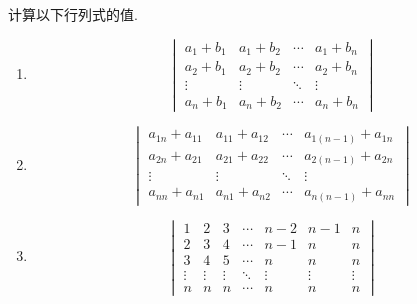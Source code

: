 \documentclass{ctexart}
\begin{document}
\begin{problem}
    计算以下行列式的值.
    \begin{enumerate}[label=\tbf{\arabic*}.,topsep=0pt,parsep=0pt,itemsep=0pt,partopsep=0pt]
        \item \[\begin{vmatrix}
                a_1+b_1&a_1+b_2&\cdots&a_1+b_n\\
                a_2+b_1&a_2+b_2&\cdots&a_2+b_n\\
                \vdots&\vdots&\ddots&\vdots\\
                a_n+b_1&a_n+b_2&\cdots&a_n+b_n
            \end{vmatrix}\]
        \item \[\begin{vmatrix}
                a_{1n}+a_{11}&a_{11}+a_{12}&\cdots&a_{1(n-1)}+a_{1n}\\
                a_{2n}+a_{21}&a_{21}+a_{22}&\cdots&a_{2(n-1)}+a_{2n}\\
                \vdots&\vdots&\ddots&\vdots\\
                a_{nn}+a_{n1}&a_{n1}+a_{n2}&\cdots&a_{n(n-1)}+a_{nn}
            \end{vmatrix}\]
        \item \[\begin{vmatrix}
                1&2&3&\cdots&n-2&n-1&n\\
                2&3&4&\cdots&n-1&n&n\\
                3&4&5&\cdots&n&n&n\\
                \vdots&\vdots&\vdots&\ddots&\vdots&\vdots&\vdots\\
                n&n&n&\cdots&n&n&n
            \end{vmatrix}\]
    \end{enumerate}
\end{problem}
\end{document}
